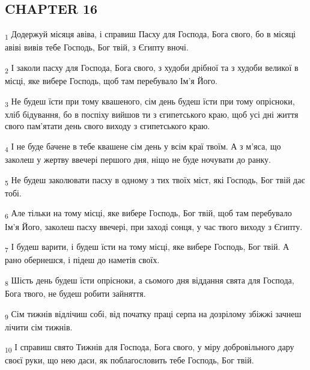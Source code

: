 \subsection{CHAPTER 16}
\begin{tcolorbox}
\textsubscript{1} Додержуй місяця авіва, і справиш Пасху для Господа, Бога свого, бо в місяці авіві вивів тебе Господь, Бог твій, з Єгипту вночі.
\end{tcolorbox}
\begin{tcolorbox}
\textsubscript{2} І заколи пасху для Господа, Бога свого, з худоби дрібної та з худоби великої в місці, яке вибере Господь, щоб там перебувало Ім'я Його.
\end{tcolorbox}
\begin{tcolorbox}
\textsubscript{3} Не будеш їсти при тому квашеного, сім день будеш їсти при тому опрісноки, хліб бідування, бо в поспіху вийшов ти з єгипетського краю, щоб усі дні життя свого пам'ятати день свого виходу з єгипетського краю.
\end{tcolorbox}
\begin{tcolorbox}
\textsubscript{4} І не буде бачене в тебе квашене сім день у всім краї твоїм. А з м'яса, що заколеш у жертву ввечері першого дня, ніщо не буде ночувати до ранку.
\end{tcolorbox}
\begin{tcolorbox}
\textsubscript{5} Не будеш заколювати пасху в одному з тих твоїх міст, які Господь, Бог твій дає тобі.
\end{tcolorbox}
\begin{tcolorbox}
\textsubscript{6} Але тільки на тому місці, яке вибере Господь, Бог твій, щоб там перебувало Ім'я Його, заколеш пасху ввечері, при заході сонця, у час твого виходу з Єгипту.
\end{tcolorbox}
\begin{tcolorbox}
\textsubscript{7} І будеш варити, і будеш їсти на тому місці, яке вибере Господь, Бог твій. А рано обернешся, і підеш до наметів своїх.
\end{tcolorbox}
\begin{tcolorbox}
\textsubscript{8} Шість день будеш їсти опрісноки, а сьомого дня віддання свята для Господа, Бога твого, не будеш робити зайняття.
\end{tcolorbox}
\begin{tcolorbox}
\textsubscript{9} Сім тижнів відлічиш собі, від початку праці серпа на дозрілому збіжжі зачнеш лічити сім тижнів.
\end{tcolorbox}
\begin{tcolorbox}
\textsubscript{10} І справиш свято Тижнів для Господа, Бога свого, у міру добровільного дару своєї руки, що нею даси, як поблагословить тебе Господь, Бог твій.
\end{tcolorbox}
